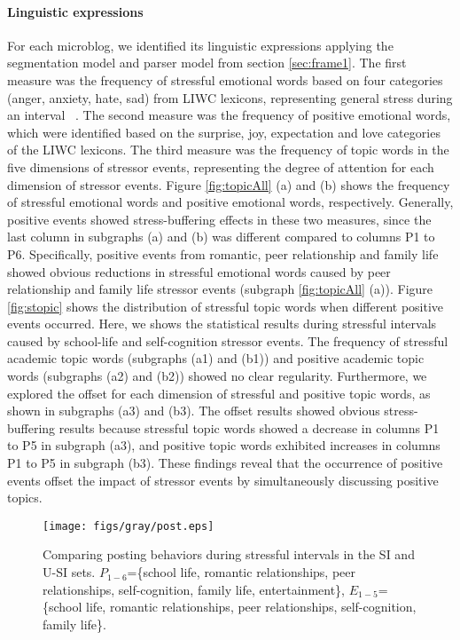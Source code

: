 \documentclass[5p,times,numbers,authoryear]{elsarticle}
\begin{document}
\paragraph{\textbf{Linguistic expressions}}
For each microblog, we identified its linguistic expressions applying the segmentation model and parser model from section \ref{sec:frame1}.
The first measure was the frequency of stressful emotional words based on four categories (anger, anxiety, hate, sad) from LIWC lexicons, representing general stress during an interval ~\citep{Tausczik2010The}.
The second measure was the frequency of positive emotional words,
which were identified based on the surprise, joy, expectation and love categories of the LIWC lexicons.
The third measure was the frequency of topic words in the five dimensions of stressor events,
representing the degree of attention for each dimension of stressor events.
Figure \ref{fig:topicAll} (a) and (b) shows the frequency of stressful emotional words and positive emotional words, respectively.
Generally, positive events showed stress-buffering effects in these two measures,
since the last column in subgraphs (a) and (b) was different compared to columns P1 to P6.
Specifically, positive events from romantic, peer relationship and family life showed obvious
reductions in stressful emotional words caused by peer relationship and family life stressor events (subgraph \ref{fig:topicAll} (a)).
Figure \ref{fig:stopic} shows the distribution of stressful topic words when different positive events occurred.
Here, we shows the statistical results during stressful intervals caused by school-life and self-cognition stressor events.
The frequency of stressful academic topic words (subgraphs (a1) and (b1))
and positive academic topic words (subgraphs (a2) and (b2)) showed no clear regularity.
Furthermore, we explored the offset for each dimension of stressful and positive topic words,
as shown in subgraphs (a3) and (b3).
The offset results showed obvious stress-buffering results
because stressful topic words showed a decrease in columns P1 to P5 in subgraph (a3),
and positive topic words exhibited increases in columns P1 to P5 in subgraph (b3).
These findings reveal that the occurrence of positive events offset the impact of stressor events by simultaneously discussing positive topics.

\begin{figure}[h]
\centering
\texttt{[image: figs/gray/post.eps]}
\caption{\small{Comparing posting behaviors during stressful intervals in the SI and U-SI sets.
$P_{1-6}$=\{school life, romantic relationships, peer relationships, self-cognition, family life, entertainment\},
$E_{1-5}$=\{school life, romantic relationships, peer relationships, self-cognition, family life\}.}}
\label{fig:post}
\end{figure}
\end{document}
